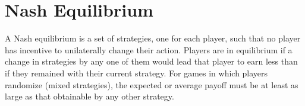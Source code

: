 \documentclass[]{report}
\begin{document}



\section{Nash Equilibrium}
A Nash equilibrium is a set of strategies, one for each player, such that no player has incentive to unilaterally change their action. Players are in equilibrium if a change in strategies by any one of them would lead that player to earn less than if they remained with their current strategy. For games in which players randomize (mixed strategies), the expected or average payoff must be at least as large as that obtainable by any other strategy.
\end{document}
